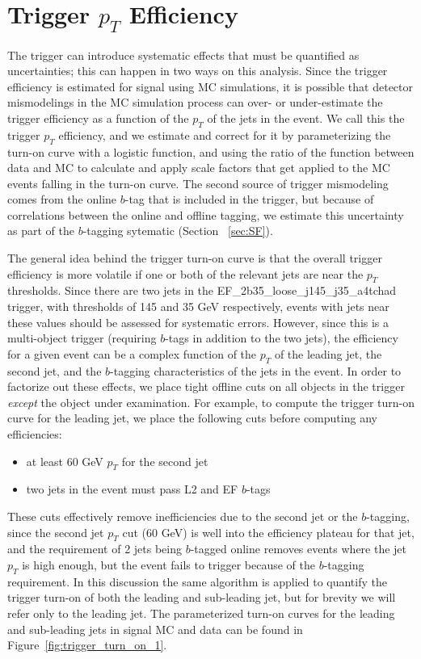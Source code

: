 \section{Trigger $p_T$ Efficiency}
\label{sec:trigger_syst}

The trigger can introduce systematic effects that must be quantified as uncertainties; 
this can happen in two ways on this analysis.  Since the trigger efficiency is estimated
for signal using MC simulations, it is possible that detector mismodelings in the MC 
simulation process can over- or under-estimate the trigger efficiency as a function 
of the $p_T$ of the jets in the event.  We call this the trigger $p_T$ efficiency,
and we estimate and correct for it by parameterizing the turn-on curve with a logistic
function, and using the ratio of the function between data and MC to calculate and 
apply scale factors that get applied to the MC events falling in the turn-on curve.  
The second source of trigger mismodeling comes from the online $b$-tag that is
included in the trigger, but because of correlations between the online and offline tagging,
we estimate this uncertainty as part of the $b$-tagging sytematic (Section ~\ref{sec:SF}).


The general idea behind the trigger turn-on curve is that the overall trigger efficiency
is more volatile if one or both of the relevant jets are near the $p_T$ thresholds.
Since there are two jets in the EF\_2b35\_loose\_j145\_j35\_a4tchad trigger, with thresholds
of 145 and 35 GeV respectively, events with jets near these values should be assessed
for systematic errors.  However, since this is a multi-object trigger (requiring $b$-tags
in addition to the two jets), the efficiency for a given event can be a complex function
of the $p_T$ of the leading jet, the second jet, and the $b$-tagging characteristics of
the jets in the event.  In order to factorize out these effects, we place tight offline
cuts on all objects in the trigger \textit{except} the object under examination. For example, 
to compute the trigger turn-on curve for the leading jet, we place the following cuts before
computing any efficiencies: 
\begin{itemize}
    \item at least 60 GeV $p_T$ for the second jet
    \item two jets in the event must pass L2 and EF $b$-tags
\end{itemize}

These cuts effectively remove inefficiencies due to the second jet or the $b$-tagging,
since the second jet $p_T$ cut (60 GeV) is well into the efficiency plateau for that
jet, and the requirement of 2 jets being $b$-tagged online removes events where the
jet $p_T$ is high enough, but the event fails to trigger because of the $b$-tagging requirement.  
In this discussion the same algorithm is applied to quantify
the trigger turn-on of both the leading and sub-leading jet, but for brevity we will
refer only to the leading jet.  The parameterized turn-on curves for the leading and 
sub-leading jets in signal MC and data can be found in Figure~\ref{fig:trigger_turn_on_1}.

